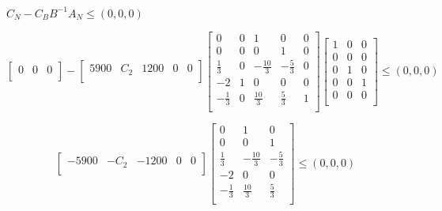 \documentclass[10pt,a4paper]{article}
\begin{document}
\begin{enumerate}[label=\textbf{\sffamily\large\arabic*.}]
    \begin{center}
    $C_{N} - C_{B}B^{-1}A_N \leq (0, 0, 0)$
    \end{center}
        \[
            \begin{bmatrix}
                0           &    0	         &    0          \\
            \end{bmatrix}  - \begin{bmatrix}
                5900           &    C_2	         &    1200 & 0 & 0          \\
            \end{bmatrix} \begin{bmatrix}
            0           & 0 &    1	        &   0            &	0 \\
            0           & 0 &    0	        &   1            &	0 \\
          \frac{1}{3}   & 0 & -\frac{10}{3} & -\frac{5}{3}   &	0 \\
           -2           & 1 &    0	        &   0            &	0 \\
           -\frac{1}{3} & 0 & \frac{10}{3}	& \frac{5}{3}    &	1 \\
        \end{bmatrix}    
        \begin{bmatrix}
        1 & 0 & 0 \\
        0 & 0 & 0 \\
        0 & 1 & 0 \\
        0 & 0 & 1 \\
        0 & 0 & 0 \\
        \end{bmatrix}
        \leq (0, 0, 0) \] 

    \[
        \begin{bmatrix}
            -5900           &    -C_2	         &    -1200 & 0 & 0          \\
        \end{bmatrix}  \begin{bmatrix}
            0           &    1	         &   0            \\
            0           &     0	         &   1            \\
          \frac{1}{3}   &  -\frac{10}{3} & -\frac{5}{3}   \\
           -2           &     0	         &   0            \\
           -\frac{1}{3} &  \frac{10}{3}	 & \frac{5}{3}    \\
        \end{bmatrix}  
        \leq (0, 0, 0)  
    \]


\end{enumerate}
\end{document}
